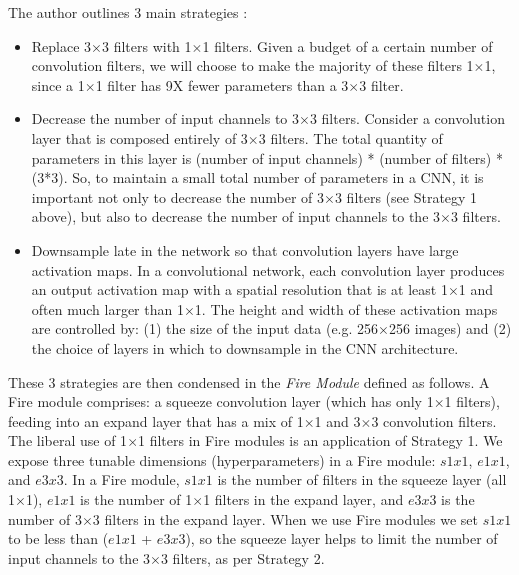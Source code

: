 \documentclass{article}
\begin{document}
        The author outlines 3 main strategies \cite{SNet}:
        \begin{itemize}
          \item Replace 3$\times$3 filters with 1$\times$1 filters. Given a budget of a certain number of convolution
          filters, we will choose to make the majority of these filters 1$\times$1, since a 1$\times$1 filter has 9X fewer
          parameters than a 3$\times$3 filter.
          \item Decrease the number of input channels to 3$\times$3 filters. Consider a convolution layer
          that is composed entirely of 3$\times$3 filters. The total quantity of parameters in this layer is (number of
          input channels) * (number of filters) * (3*3). So, to maintain a small total number of parameters
          in a CNN, it is important not only to decrease the number of 3$\times$3 filters (see Strategy 1 above), but
          also to decrease the number of input channels to the 3$\times$3 filters.
          \item Downsample late in the network so that convolution layers have large activation
          maps. In a convolutional network, each convolution layer produces an output activation map with
          a spatial resolution that is at least 1$\times$1 and often much larger than 1$\times$1. The height and width of
          these activation maps are controlled by: (1) the size of the input data (e.g. 256$\times$256 images) and (2) 
          the choice of layers in which to downsample in the CNN architecture.
        \end{itemize}

        These 3 strategies are then condensed in the \emph{Fire Module} defined as follows. A Fire module comprises: a squeeze convolution layer
        (which has only 1$\times$1 filters), feeding into an expand layer that has a mix of 1$\times$1 and 3$\times$3 convolution
        filters. The liberal use of 1$\times$1 filters in Fire modules is an application
        of Strategy 1. We expose three tunable dimensions (hyperparameters) in a Fire
        module: $s1x1$, $e1x1$, and $e3x3$. In a Fire module, $s1x1$ is the number of filters in the squeeze layer
        (all 1$\times$1), $e1x1$ is the number of 1$\times$1 filters in the expand layer, and $e3x3$ is the number of 3$\times$3 filters
        in the expand layer. When we use Fire modules we set $s1x1$ to be less than ($e1x1$ + $e3x3$), so the
        squeeze layer helps to limit the number of input channels to the 3$\times$3 filters, as per Strategy 2.
\end{document}
